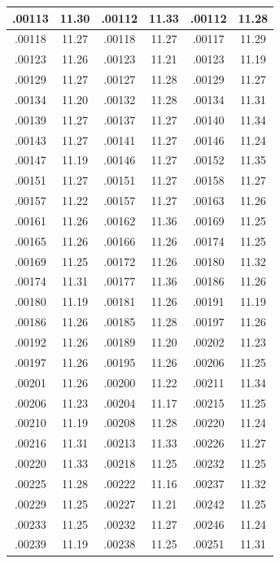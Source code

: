 \documentclass[11pt]{report}
\begin{document}
\begin{appendices}
\begin{longtable}{|c|c||c|c||c|c|}
.00113 & 11.30 & .00112 & 11.33 & .00112 & 11.28\\\hline
.00118 & 11.27 & .00118 & 11.27 & .00117 & 11.29\\\hline
.00123 & 11.26 & .00123 & 11.21 & .00123 & 11.19\\\hline
.00129 & 11.27 & .00127 & 11.28 & .00129 & 11.27\\\hline
.00134 & 11.20 & .00132 & 11.28 & .00134 & 11.31\\\hline
.00139 & 11.27 & .00137 & 11.27 & .00140 & 11.34\\\hline
.00143 & 11.27 & .00141 & 11.27 & .00146 & 11.24\\\hline
.00147 & 11.19 & .00146 & 11.27 & .00152 & 11.35\\\hline
.00151 & 11.27 & .00151 & 11.27 & .00158 & 11.27\\\hline
.00157 & 11.22 & .00157 & 11.27 & .00163 & 11.26\\\hline
.00161 & 11.26 & .00162 & 11.36 & .00169 & 11.25\\\hline
.00165 & 11.26 & .00166 & 11.26 & .00174 & 11.25\\\hline
.00169 & 11.25 & .00172 & 11.26 & .00180 & 11.32\\\hline
.00174 & 11.31 & .00177 & 11.36 & .00186 & 11.26\\\hline
.00180 & 11.19 & .00181 & 11.26 & .00191 & 11.19\\\hline
.00186 & 11.26 & .00185 & 11.28 & .00197 & 11.26\\\hline
.00192 & 11.26 & .00189 & 11.20 & .00202 & 11.23\\\hline
.00197 & 11.26 & .00195 & 11.26 & .00206 & 11.25\\\hline
.00201 & 11.26 & .00200 & 11.22 & .00211 & 11.34\\\hline
.00206 & 11.23 & .00204 & 11.17 & .00215 & 11.25\\\hline
.00210 & 11.19 & .00208 & 11.28 & .00220 & 11.24\\\hline
.00216 & 11.31 & .00213 & 11.33 & .00226 & 11.27\\\hline
.00220 & 11.33 & .00218 & 11.25 & .00232 & 11.25\\\hline
.00225 & 11.28 & .00222 & 11.16 & .00237 & 11.32\\\hline
.00229 & 11.25 & .00227 & 11.21 & .00242 & 11.25\\\hline
.00233 & 11.25 & .00232 & 11.27 & .00246 & 11.24\\\hline
.00239 & 11.19 & .00238 & 11.25 & .00251 & 11.31\\\hline

\end{longtable}
\end{appendices}
\end{document}
